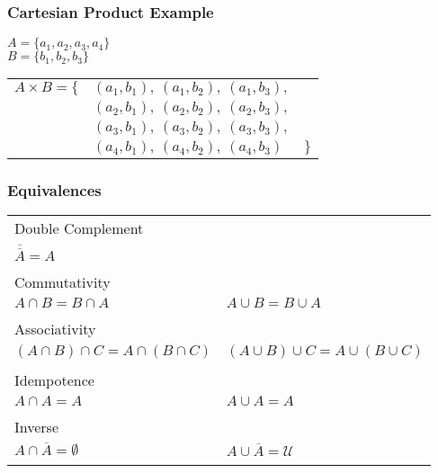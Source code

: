 \documentclass[dvipsnames]{beamer}
\begin{document}
\begin{frame}
  \frametitle{Cartesian Product Example}

  $A = \{a_1, a_2, a_3, a_4\}$\\\smallskip
  $B = \{b_1, b_2, b_3\}$

  \bigskip
  \begin{tabular}{rll}
    $A \times B = \{$ & $(a_1, b_1),~(a_1, b_2),~(a_1, b_3),$ &\\
                      & $(a_2, b_1),~(a_2, b_2),~(a_2, b_3),$ &\\
                      & $(a_3, b_1),~(a_3, b_2),~(a_3, b_3),$ &\\
                      & $(a_4, b_1),~(a_4, b_2),~(a_4, b_3)$  & $\}$
  \end{tabular}
\end{frame}

\begin{frame}
  \frametitle{Equivalences}

  \begin{tabular}{ll}
    \alert{Double Complement} &\\
      $\overline{\overline{A}} = A$\\\\
    \pause
    \alert{Commutativity} &\\
      $A \cap B = B \cap A$ &
      $A \cup B = B \cup A$\\\\
    \pause
    \alert{Associativity} &\\
      $(A \cap B) \cap C = A \cap (B \cap C)$ &
      $(A \cup B) \cup C = A \cup (B \cup C)$\\\\
    \pause
    \alert{Idempotence} &\\
      $A \cap A = A$ &
      $A \cup A = A$\\\\
    \pause
    \alert{Inverse} &\\
      $A \cap \overline{A} = \emptyset$ &
      $A \cup \overline{A} = \mathcal{U}$\\\\
  \end{tabular}
\end{frame}
\end{document}

